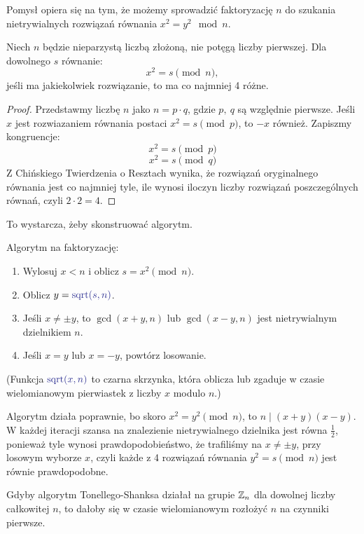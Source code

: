 Pomysł opiera się na tym, że możemy sprowadzić faktoryzację \( n \) do szukania nietrywialnych rozwiązań równania \( x^2 = y^2 \mod n \).

\begin{lemma}
Niech \( n \) będzie nieparzystą liczbą złożoną, nie potęgą liczby pierwszej. Dla dowolnego \( s \) równanie:
\[
    x^2 = s \pmod{n},
\]
jeśli ma jakiekolwiek rozwiązanie, to ma co najmniej 4 różne.
\end{lemma}
\begin{proof}
    Przedstawmy liczbę \( n \) jako \( n = p \cdot q \), gdzie \( p, \ q \) są względnie pierwsze. Jeśli \( x \) jest rozwiazaniem równania postaci \( x^2 = s \pmod{p} \), to \( -x \) również. Zapiszmy kongruencje:
    \[
        x^2 = s \pmod{p}
    \]
    \[
        x^2 = s \pmod{q}
    \]
    Z Chińskiego Twierdzenia o Resztach wynika, że rozwiązań oryginalnego równania jest co najmniej tyle, ile wynosi iloczyn liczby rozwiązań poszczególnych równań, czyli \( 2 \cdot 2 = 4 \).
\end{proof}
To wystarcza, żeby skonstruować algorytm.
\begin{greyframe}
    Algorytm na faktoryzację:
    \begin{enumerate}
        \item Wylosuj \( x < n \) i oblicz \( s = x^2 \pmod{n} \).
        \item Oblicz \( y = \textcolor{Blue}{\text{sqrt}(s, n)} \).
        \item Jeśli \( x \neq \pm y \), to \( \gcd(x + y, n) \) lub \( \gcd(x - y, n) \) jest nietrywialnym dzielnikiem \( n \).
        \item Jeśli \( x = y \) lub \( x = -y \), powtórz losowanie.
    \end{enumerate}
\end{greyframe}
{\small (Funkcja \( \textcolor{Blue}{\text{sqrt}(x, n)} \) to czarna skrzynka, która oblicza lub zgaduje w czasie wielomianowym pierwiastek z liczby \( x \) modulo \( n \).)}

Algorytm działa poprawnie, bo skoro \( x^2 = y^2 \pmod{n} \), to \( n \mid (x + y)(x - y) \). W każdej iteracji szansa na znalezienie nietrywialnego dzielnika jest równa \( \frac{1}{2} \), ponieważ tyle wynosi prawdopodobieństwo, że trafiliśmy na \( x \neq \pm y \), przy losowym wyborze \( x \), czyli każde z 4 rozwiązań równania \( y^2 = s \pmod{n} \) jest równie prawdopodobne.

Gdyby algorytm Tonellego-Shanksa działał na grupie \( \mathbb{Z}_n \) dla dowolnej liczby całkowitej \( n \), to dałoby się w czasie wielomianowym rozłożyć \( n \) na czynniki pierwsze.